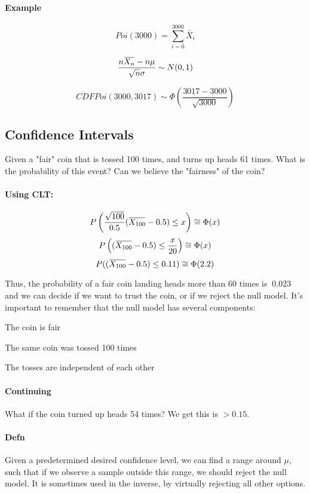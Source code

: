 \documentclass[a4paper]{article}
\newenvironment{itemize*}%
  {\begin{itemize}%
    \setlength{\itemsep}{0pt}%
    \setlength{\parsep}{0pt}%
    \setlength{\parskip}{0pt}}%
  {\end{itemize}}
\newcommand{\mean}[1]{\mkern 1.5mu\overline{\mkern-1.5mu#1\mkern-1.5mu}\mkern 1.5mu}
\begin{document}
\paragraph{Example}
\[Poi(3000)=\sum_{i=0}^{3000}\bar X_i\]

\[\frac{n\mean{X_n}-n\mu}{\sqrt{n}\sigma} \sim N(0,1)\]

\[CDFPoi(3000,3017) \sim \Phi\left(\frac{3017-3000}{\sqrt{3000}}\right)\]

\subsection{Confidence Intervals}
Given a "fair" coin that is tossed 100 times, and turns up heads 61 times. What is the probability of this event? Can we believe the "fairness" of the coin?

\paragraph{Using CLT:}
\[P\left( \frac{\sqrt{100}}{0.5} (\mean{X_{100}}-0.5) \le x \right) \cong \Phi(x)\]
\[P\left((\mean{X_{100}}-0.5) \le \frac{x}{20}\right) \cong \Phi(x)\]
\[P((\mean{X_{100}}- 0.5) \le 0.11) \cong \Phi(2.2)\]

Thus, the probability of a fair coin landing heads more than 60 times is $~0.023$ and we can decide if we want to trust the coin, or if we reject the null model. It's important to remember that the null model has several components:

\begin{itemize*}
  \item The coin is fair
  \item The same coin was tossed 100 times
  \item The tosses are independent of each other
\end{itemize*}

\paragraph{Continuing}
What if the coin turned up heads 54 times? We get this is $>0.15$.

\paragraph{Defn}
Given a predetermined desired confidence level, we can find a range around $\mu$, such that if we observe a sample outside this range, we should reject the null model. It is sometimes used in the inverse, by virtually rejecting all other options.
\end{document}
